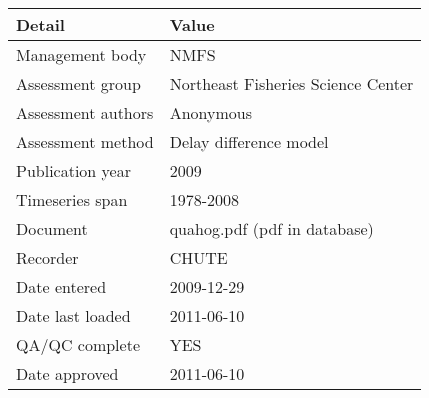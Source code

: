 \begin{table}[htb]
\centering
\begin{tabular}{lp{7cm}}
\toprule
Detail & Value \\
\midrule
Management body    & NMFS                               \\
Assessment group   & Northeast Fisheries Science Center \\
Assessment authors & Anonymous                          \\
Assessment method  & Delay difference model             \\
Publication year   & 2009                               \\
Timeseries span    & 1978-2008                          \\
Document           & quahog.pdf (pdf in database)       \\
Recorder           & CHUTE                              \\
Date entered       & 2009-12-29                         \\
Date last loaded   & 2011-06-10                         \\
QA/QC complete     & YES                                \\
Date approved      & 2011-06-10                         \\
\bottomrule
\end{tabular}
\label{tab:assessdet}
\end{table}
